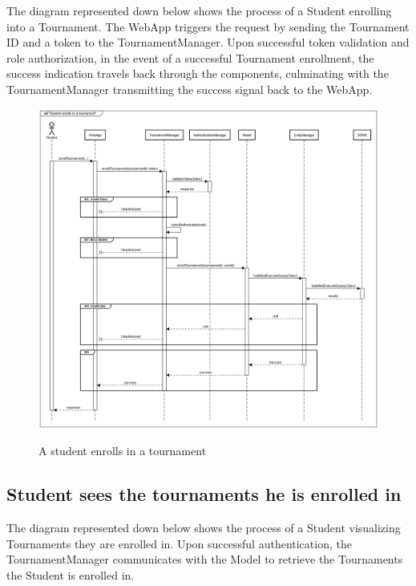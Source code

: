 \documentclass{Configuration_Files/Template}
\begin{document}
The diagram represented down below shows the process of a Student enrolling into a Tournament. The WebApp triggers the request by sending the Tournament ID and a token to the TournamentManager. Upon successful token validation and role authorization, in the event of a successful Tournament enrollment, the success indication travels back through the components, culminating with the TournamentManager transmitting the success signal back to the WebApp.

\begin{figure}[H]
\centering
\includegraphics[scale = 0.33]{Images/diagrams/sequences/enrollTournament.png}\\
\caption{A student enrolls in a tournament  }
\end{figure}

\subsection*{Student sees the tournaments he is enrolled in}

The diagram represented down below shows the process of a Student visualizing Tournaments they are enrolled in. Upon successful authentication, the TournamentManager communicates with the Model to retrieve the Tournaments the Student is enrolled in.
\end{document}
